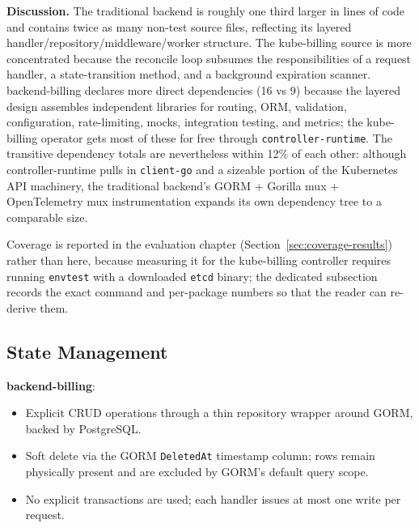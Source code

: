 \textbf{Discussion.} The traditional backend is roughly one third larger in lines of code and contains twice as many non-test source files, reflecting its layered handler/repository/middleware/worker structure. The kube-billing source is more concentrated because the reconcile loop subsumes the responsibilities of a request handler, a state-transition method, and a background expiration scanner. backend-billing declares more direct dependencies (16 vs 9) because the layered design assembles independent libraries for routing, ORM, validation, configuration, rate-limiting, mocks, integration testing, and metrics; the kube-billing operator gets most of these for free through \texttt{controller-runtime}. The transitive dependency totals are nevertheless within 12\% of each other: although controller-runtime pulls in \texttt{client-go} and a sizeable portion of the Kubernetes API machinery, the traditional backend's GORM + Gorilla mux + OpenTelemetry mux instrumentation expands its own dependency tree to a comparable size.

Coverage is reported in the evaluation chapter (Section~\ref{sec:coverage-results}) rather than here, because measuring it for the kube-billing controller requires running \texttt{envtest} with a downloaded \texttt{etcd} binary; the dedicated subsection records the exact command and per-package numbers so that the reader can re-derive them.

\subsection{State Management}

\textbf{backend-billing}:
\begin{itemize}
    \item Explicit CRUD operations through a thin repository wrapper around GORM, backed by PostgreSQL.
    \item Soft delete via the GORM \texttt{DeletedAt} timestamp column; rows remain physically present and are excluded by GORM's default query scope.
    \item No explicit transactions are used; each handler issues at most one write per request.
\end{itemize}

